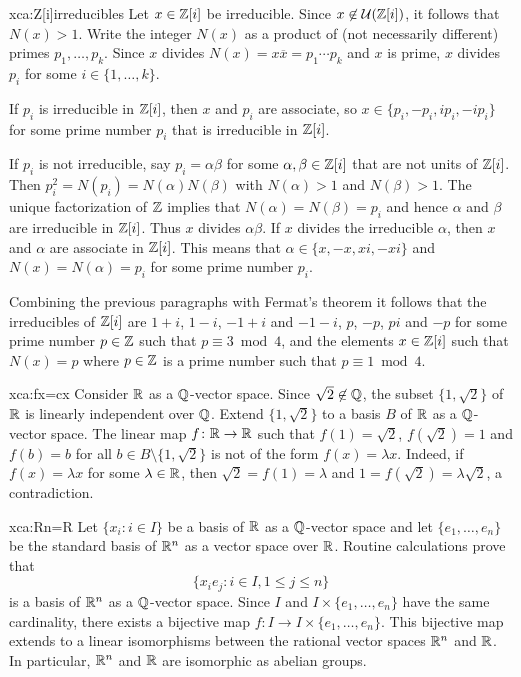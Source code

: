\begin{sol}{xca:Z[i]irreducibles}
	Let $x\in\mathbb{Z}[i]$ be irreducible. Since 
	$x\not\in\mathcal{U}(\mathbb{Z}[i])$, it follows that $N(x)>1$. Write
	the integer $N(x)$ as a product of (not necessarily different) primes $p_1,\dots,p_k$. Since 
	$x$ divides $N(x)=x\overline{x}=p_1\cdots p_k$ and $x$ is prime, 
	$x$ divides $p_i$ for some $i\in\{1,\dots,k\}$. 
	
	If $p_i$ is irreducible in $\mathbb{Z}[i]$, 
	then $x$ and $p_i$ are associate, so $x\in\{p_i,-p_i,ip_i,-ip_i\}$ for some
	prime number $p_i$ that is irreducible in $\mathbb{Z}[i]$. 
	
	If $p_i$ is not irreducible, say $p_i=\alpha\beta$ for some $\alpha,\beta\in\mathbb{Z}[i]$ that
	are not units of $\mathbb{Z}[i]$. Then 
	$p_i^2=N(p_i)=N(\alpha)N(\beta)$ with $N(\alpha)>1$ and $N(\beta)>1$. The unique factorization
	of $\mathbb{Z}$ implies that $N(\alpha)=N(\beta)=p_i$ and hence $\alpha$ and $\beta$ 
	are irreducible in $\mathbb{Z}[i]$. Thus $x$ divides 
	$\alpha\beta$. If $x$ divides the irreducible $\alpha$, 
	then $x$ and $\alpha$ are associate in $\mathbb{Z}[i]$. This means that 
	$\alpha\in\{x,-x,xi,-xi\}$ and $N(x)=N(\alpha)=p_i$ for some prime number $p_i$.  
	
	Combining the previous paragraphs with Fermat's theorem it follows that 
	the irreducibles of $\mathbb{Z}[i]$ are $1+i$, $1-i$, $-1+i$ and $-1-i$, 
	$p$, $-p$, $pi$ and $-p$ for some prime number $p\in\mathbb{Z}$ such that $p\equiv3\bmod 4$, and 
	the elements $x\in\mathbb{Z}[i]$ such that $N(x)=p$ where $p\in\mathbb{Z}$ is a prime number such that $p\equiv1\bmod 4$. 
\end{sol}


\begin{sol}{xca:fx=cx}
    Consider $\mathbb{R}$ as a $\mathbb{Q}$-vector space. 
    Since $\sqrt{2}\not\in\mathbb{Q}$, the subset $\{1,\sqrt{2}\}$ of $\mathbb{R}$ 
    is linearly independent 
    over $\mathbb{Q}$. Extend $\{1,\sqrt{2}\}$ 
    to a basis $B$ of $\mathbb{R}$ as a $\mathbb{Q}$-vector space. The
    linear map $f\colon\mathbb{R}\to\mathbb{R}$ such that
    $f(1)=\sqrt{2}$, $f(\sqrt{2})=1$ and $f(b)=b$ for all $b\in B\setminus\{1,\sqrt{2}\}$ 
    is not of the form $f(x)=\lambda x$. Indeed, if $f(x)=\lambda x$ for some $\lambda\in\mathbb{R}$, 
    then $\sqrt{2}=f(1)=\lambda$ and $1=f(\sqrt{2})=\lambda\sqrt{2}$, a contradiction. 
\end{sol}

\begin{sol}{xca:Rn=R}
    Let $\{x_i:i\in I\}$ be a basis of $\mathbb{R}$ as a $\mathbb{Q}$-vector space and
    let $\{e_1,\dots,e_n\}$ be the standard basis of $\mathbb{R}^n$ as a vector space over $\mathbb{R}$. 
    Routine calculations prove that  
    \[
    \{x_ie_j:i\in I,1\leq j\leq n\}
    \]
    is a basis of $\mathbb{R}^n$ as a $\mathbb{Q}$-vector space. 
    Since
    $I$ and $I\times\{e_1,\dots,e_n\}$ have the same cardinality, 
    there exists a bijective map $f\colon I\to I\times\{e_1,\dots,e_n\}$. This bijective
    map extends to a linear isomorphisms between the rational vector spaces 
    $\mathbb{R}^n$ and
    $\mathbb{R}$. In particular, $\mathbb{R}^n$ and 
    $\mathbb{R}$ are isomorphic as abelian groups. 
\end{sol}


